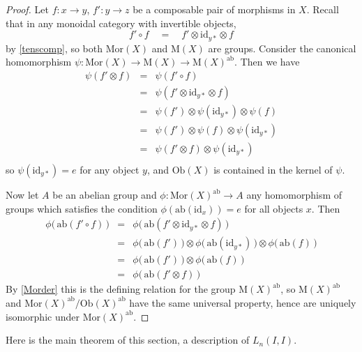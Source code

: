 \documentclass{amsbook} %
\numberwithin{section}{chapter}
\begin{document}
\begin{proof}
Let  $f: x \to y$, $f': y \to z$ be a composable pair of morphisms in $X$. Recall  that in any monoidal category with invertible objects,
\[ f' \circ f \quad = \quad f' \otimes \mathrm{id}_{y*} \otimes f \]
by \cref{tenscomp}, so both $\mathrm{Mor}(X)$ and $\mathrm{M}(X)$ are groups. Consider the canonical homomorphism $\psi: \mathrm{Mor}(X) \to \mathrm{M}(X) \to \mathrm{M}(X)^{\mathrm{ab}}$. Then we have
\[ \begin{array}{rll}
			\psi(f' \otimes f) & = & \psi(f' \circ f) \\
			& = & \psi(f' \otimes \mathrm{id}_{y*} \otimes f) \\
			& = & \psi(f') \otimes \psi(\mathrm{id}_{y*}) \otimes \psi(f) \\
			& = & \psi(f') \otimes \psi(f) \otimes \psi(\mathrm{id}_{y*}) \\
			& = & \psi(f' \otimes f) \otimes \psi(\mathrm{id}_{y*}) \\
		\end{array}
\]
so $\psi(\mathrm{id}_{y*}) = e$ for any object $y$, and $\mathrm{Ob}(X)$ is contained in the kernel of $\psi$.

Now let $A$ be an abelian group and $\phi: \mathrm{Mor}(X)^{\mathrm{ab}} \to A$ any homomorphism of groups which satisfies the condition $\phi(\mathrm{ab}(\mathrm{id}_x)) = e$ for all objects $x$. Then
\[ \begin{array}{rll}
			\phi\big( \, \mathrm{ab}(f' \circ f) \, \big)  & = & \phi\big( \, \mathrm{ab}(f' \otimes \mathrm{id}_{y*} \otimes f) \, \big) \\
			& = & \phi\big( \, \mathrm{ab}(f') \, \big) \otimes \phi\big( \, \mathrm{ab}(\mathrm{id}_{y*}) \, \big) \otimes \phi\big( \, \mathrm{ab}(f) \, \big) \\
			& = & \phi\big( \, \mathrm{ab}(f') \, \big) \otimes \phi\big( \, \mathrm{ab}(f) \, \big) \\
			& = & \phi\big( \, \mathrm{ab}(f' \otimes f) \, \big)
		\end{array}
\]
By \cref{Morder} this is the defining relation for the group $\mathrm{M}(X)^{\mathrm{ab}}$, so $\mathrm{M}(X)^{\mathrm{ab}}$ and $\mathrm{Mor}(X)^{\mathrm{ab}}/\mathrm{Ob}(X)^{\mathrm{ab}}$ have the same universal property, hence are uniquely isomorphic under $\mathrm{Mor}(X)^{\mathrm{ab}}$.
\end{proof}

Here is the main theorem of this section, a description of $L_n(I,I)$.
\end{document}
